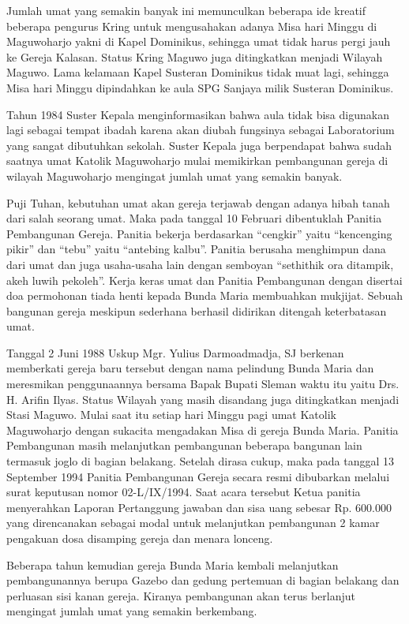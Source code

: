 	Jumlah umat yang semakin banyak ini memunculkan beberapa ide kreatif beberapa pengurus Kring untuk mengusahakan adanya Misa hari Minggu di Maguwoharjo yakni di Kapel Dominikus, sehingga umat tidak harus pergi jauh ke Gereja Kalasan. Status Kring Maguwo juga ditingkatkan menjadi Wilayah Maguwo. Lama kelamaan Kapel Susteran Dominikus tidak muat lagi, sehingga Misa hari Minggu dipindahkan ke aula SPG Sanjaya milik Susteran Dominikus.

	Tahun 1984 Suster Kepala menginformasikan bahwa aula tidak bisa digunakan lagi sebagai tempat ibadah karena akan diubah fungsinya sebagai Laboratorium yang sangat dibutuhkan sekolah. Suster Kepala juga berpendapat bahwa sudah saatnya umat Katolik Maguwoharjo mulai memikirkan pembangunan gereja di wilayah Maguwoharjo mengingat jumlah umat yang semakin banyak.

	Puji Tuhan, kebutuhan umat akan gereja terjawab dengan adanya hibah tanah dari salah seorang umat. Maka pada tanggal 10 Februari dibentuklah Panitia Pembangunan Gereja. Panitia bekerja berdasarkan ``cengkir'' yaitu ``kencenging pikir'' dan ``tebu'' yaitu ``antebing kalbu''. Panitia berusaha menghimpun dana dari umat dan juga usaha-usaha lain dengan semboyan ``sethithik ora ditampik, akeh luwih pekoleh''. Kerja keras umat dan Panitia Pembangunan dengan disertai doa permohonan tiada henti kepada Bunda Maria membuahkan mukjijat. Sebuah bangunan gereja meskipun sederhana berhasil didirikan ditengah keterbatasan umat. 

	Tanggal 2 Juni 1988 Uskup Mgr. Yulius Darmoadmadja, SJ berkenan memberkati  gereja baru tersebut dengan nama pelindung Bunda Maria dan meresmikan penggunaannya bersama Bapak Bupati Sleman waktu itu yaitu Drs. H. Arifin Ilyas. Status Wilayah yang masih disandang juga ditingkatkan menjadi Stasi Maguwo. Mulai saat itu setiap hari Minggu pagi umat Katolik Maguwoharjo dengan sukacita mengadakan Misa di gereja Bunda Maria. Panitia Pembangunan masih melanjutkan pembangunan beberapa bangunan lain termasuk joglo di bagian belakang.  Setelah dirasa cukup, maka pada tanggal 13 September 1994 Panitia Pembangunan Gereja secara resmi dibubarkan melalui surat keputusan nomor 02-L/IX/1994. Saat acara tersebut Ketua panitia menyerahkan Laporan Pertanggung jawaban dan sisa uang sebesar Rp. 600.000 yang direncanakan sebagai modal untuk melanjutkan pembangunan 2 kamar pengakuan dosa disamping gereja dan menara lonceng.

	Beberapa tahun kemudian gereja Bunda Maria kembali melanjutkan pembangunannya berupa Gazebo dan gedung pertemuan di bagian belakang dan perluasan sisi kanan gereja. Kiranya pembangunan akan terus berlanjut mengingat jumlah umat yang semakin berkembang. 

